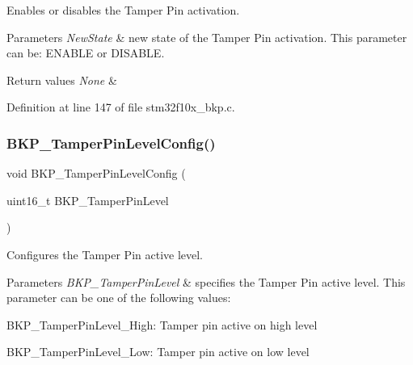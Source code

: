 Enables or disables the Tamper Pin activation. 


\begin{DoxyParams}{Parameters}
{\em New\+State} & new state of the Tamper Pin activation. This parameter can be\+: E\+N\+A\+B\+LE or D\+I\+S\+A\+B\+LE. \\
\hline
\end{DoxyParams}

\begin{DoxyRetVals}{Return values}
{\em None} & \\
\hline
\end{DoxyRetVals}


Definition at line 147 of file stm32f10x\+\_\+bkp.\+c.

\mbox{\label{group___b_k_p___exported___functions_gae216446d641d075fb575ce6dbe2ff4c1}} 
\subsubsection{\texorpdfstring{B\+K\+P\+\_\+\+Tamper\+Pin\+Level\+Config()}{BKP\_TamperPinLevelConfig()}}
{\footnotesize\ttfamily void B\+K\+P\+\_\+\+Tamper\+Pin\+Level\+Config (\begin{DoxyParamCaption}\item[{uint16\+\_\+t}]{B\+K\+P\+\_\+\+Tamper\+Pin\+Level }\end{DoxyParamCaption})}



Configures the Tamper Pin active level. 


\begin{DoxyParams}{Parameters}
{\em B\+K\+P\+\_\+\+Tamper\+Pin\+Level} & specifies the Tamper Pin active level. This parameter can be one of the following values\+: \begin{DoxyItemize}
\item B\+K\+P\+\_\+\+Tamper\+Pin\+Level\+\_\+\+High\+: Tamper pin active on high level \item B\+K\+P\+\_\+\+Tamper\+Pin\+Level\+\_\+\+Low\+: Tamper pin active on low level \end{DoxyItemize}
\\
\hline
\end{DoxyParams}

